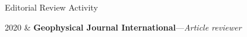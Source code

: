 \begin{rSection}{Editorial Review Activity}
	\begin{timeline}
		2020 & \textbf{Geophysical Journal International}---\textit{Article reviewer}\\
	\end{timeline}
\end{rSection}